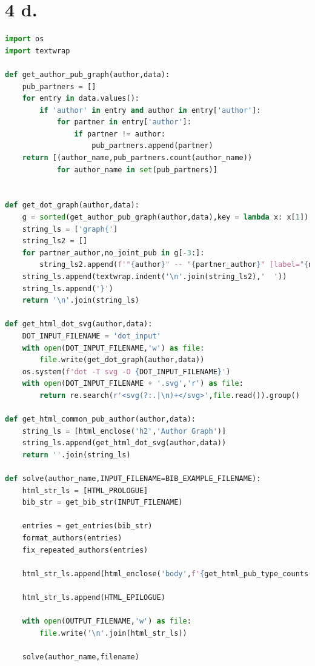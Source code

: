 \documentclass[11pt,a4paper]{report}
\begin{document}
\section{4 d.}
\begin{lstlisting}[language=python]
import os
import textwrap

def get_author_pub_graph(author,data):
    pub_partners = []
    for entry in data.values():
        if 'author' in entry and author in entry['author']:
            for partner in entry['author']:
                if partner != author:
                    pub_partners.append(partner)
    return [(author_name,pub_partners.count(author_name))
            for author_name in set(pub_partners)]


def get_dot_graph(author,data):
    g = sorted(get_author_pub_graph(author,data),key = lambda x: x[1])
    string_ls = ['graph{']
    string_ls2 = []
    for partner_author,no_joint_pub in g[-3:]:
        string_ls2.append(f'"{author}" -- "{partner_author}" [label="{no_joint_pub}"]')
    string_ls.append(textwrap.indent('\n'.join(string_ls2),'  '))
    string_ls.append('}')
    return '\n'.join(string_ls)

def get_html_dot_svg(author,data):
    DOT_INPUT_FILENAME = 'dot_input'
    with open(DOT_INPUT_FILENAME,'w') as file:
        file.write(get_dot_graph(author,data))
    os.system(f'dot -T svg -O {DOT_INPUT_FILENAME}')
    with open(DOT_INPUT_FILENAME + '.svg','r') as file:
        return re.search(r'<svg(?:.|\n)+</svg>',file.read()).group()

def get_html_common_pub_author(author,data):
    string_ls = [html_enclose('h2','Author Graph')]
    string_ls.append(get_html_dot_svg(author,data))
    return ''.join(string_ls)

def solve(author_name,INPUT_FILENAME=BIB_EXAMPLE_FILENAME):
    html_str_ls = [HTML_PROLOGUE]
    bib_str = get_bib_str(INPUT_FILENAME)

    entries = get_entries(bib_str)
    format_authors(entries)
    fix_repeated_authors(entries)

    html_str_ls.append(html_enclose('body',f'{get_html_pub_type_counts(entries)}{get_html_common_pub_author(author_name,entries)}{get_html_pub_type_index(entries)}{get_html_author_index(entries)}'))

    html_str_ls.append(HTML_EPILOGUE)

    with open(OUTPUT_FILENAME,'w') as file:
        file.write('\n'.join(html_str_ls))

    solve(author_name,filename)


\end{lstlisting}
\end{document}
